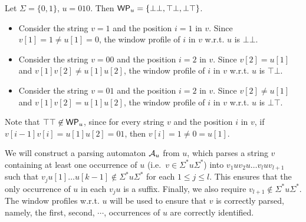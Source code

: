 \begin{example}\label{wprof-exmp}
Let $\Sigma = \{0,1\}$, $u = 010$. Then $\mathsf{WP}_{u}=\{\bot\bot, \top\bot, \bot\top\}$.
\begin{itemize}
\item Consider the string $v=1$ and the position $i=1$ in $v$. Since $v[1]=1 \neq u[1]=0$, the window profile of $i$ in $v$ w.r.t. $u$ is $\bot \bot$.
\item Consider the string $v=00$ and the position $i=2$ in $v$. Since $v[2]=u[1]$ and $v[1]v[2] \neq u[1]u[2]$, the window profile of $i$ in $v$ w.r.t. $u$ is $\top\bot$.
\item Consider the string $v=01$ and the position $i=2$ in $v$. Since $v[2] \neq u[1]$ and $v[1]v[2] = u[1]u[2]$, the window profile of $i$ in $v$ w.r.t. $u$ is $\bot\top$.
\end{itemize}
Note that $\top\top \not \in \mathsf{WP}_{u}$, since for every string $v$ and the position $i$ in $v$, if $v[i-1]v[i]=u[1]u[2]=01$, then $v[i]=1 \neq 0= u[1]$.
\end{example}


We will construct a parsing automaton $\mathcal{A}_u$ from $u$, which parses a string $v$ containing at least one occurrence of $u$ (i.e.\ $v \in \Sigma^\ast u \Sigma^\ast$) into $v_1 u v_2 u \dots v_l u v_{l+1}$ such that $v_j u[1] \dots u[k-1] \not \in \Sigma^\ast u \Sigma^\ast$ for each $1 \le j \le l$.
This ensures that the only occurrence of $u$ in each $v_j u$ is a suffix.
Finally, we also require $v_{l+1} \not \in \Sigma^\ast u \Sigma^\ast$.
The window profiles w.r.t. $u$ will be used to ensure that $v$ is correctly parsed, namely, the first, second, $\cdots$, occurrences of $u$ are correctly identified.

